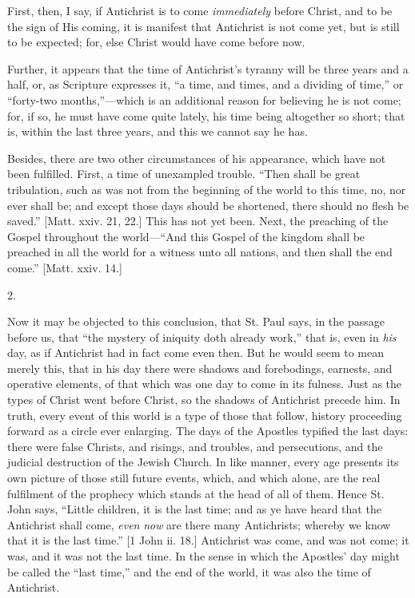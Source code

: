 First, then, I say, if Antichrist is to come \emph{immediately}
before Christ, and to be the sign of His coming, it is manifest that
Antichrist is not come yet, but is still to be expected; for, else
Christ would have come before now.

Further, it appears that the time of Antichrist's tyranny will be
three years and a half, or, as Scripture expresses it, ``a time,
and times, and a dividing of time,'' or ``forty-two
months,''—which is an additional reason for believing he is not
come; for, if so, he must have come quite lately, his time being
altogether so short; that is, within the last three years, and this we
cannot say he has.

Besides, there are two other circumstances of his appearance, which
have not been fulfilled. First, a time of unexampled trouble.
``Then shall be great tribulation, such as was not from the
beginning of the world to this time, no, nor ever shall be; and except
those days should be shortened, there should no flesh be saved.''
[Matt. xxiv. 21, 22.] This has not yet been. Next, the preaching of
the Gospel throughout the world—``And this Gospel of the kingdom
shall be preached in all the world for a witness unto all nations, and
then shall the end come.'' [Matt. xxiv. 14.]

2.

Now it may be objected to this conclusion, that St. Paul says, in
the passage before us, that ``the mystery of iniquity doth already
work,'' that is, even in \emph{his} day, as if Antichrist had in
fact come even then. But he would seem to mean merely this, that
in his day there were shadows and forebodings, earnests, and operative
elements, of that which was one day to come in its fulness. Just as
the types of Christ went before Christ, so the shadows of Antichrist
precede him. In truth, every event of this world is a type of those
that follow, history proceeding forward as a circle ever enlarging.
The days of the Apostles typified the last days: there were false
Christs, and risings, and troubles, and persecutions, and the judicial
destruction of the Jewish Church. In like manner, every age presents
its own picture of those still future events, which, and which alone,
are the real fulfilment of the prophecy which stands at the head of
all of them. Hence St. John says, ``Little children, it is the
last time; and as ye have heard that the Antichrist shall come, \emph{even}
\emph{now} are there many Antichrists; whereby we know that it is the
last time.'' [1 John ii. 18.] Antichrist was come, and was not
come; it was, and it was not the last time. In the sense in which the
Apostles' day might be called the ``last time,'' and the end
of the world, it was also the time of Antichrist.

